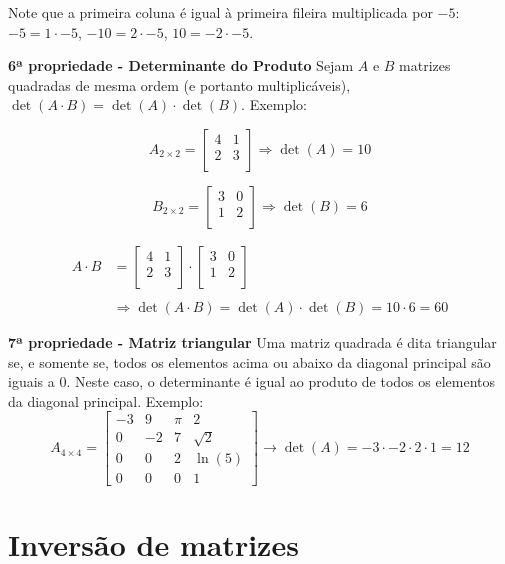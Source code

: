 \documentclass[
  portuguese,
  letterpaper,
  DIV=11,
  numbers=noendperiod]{scrreport}
\begin{document}
Note que a primeira coluna é igual à primeira fileira multiplicada por
\(-5\): \(-5 = 1 \cdot -5\), \(-10 = 2 \cdot -5\), \(10 = -2 \cdot -5\).

\textbf{6ª propriedade - Determinante do Produto} Sejam \(A\) e \(B\)
matrizes quadradas de mesma ordem (e portanto multiplicáveis),
\(\det(A \cdot B) = \det(A) \cdot \det(B)\). Exemplo:

\[
A_{2\times2} =
\begin{bmatrix}
    4 & 1 \\
    2 & 3 \\
\end{bmatrix}
\Rightarrow \det(A) = 10
\]

\[
B_{2\times2} =
\begin{bmatrix}
    3 & 0 \\
    1 & 2 \\
\end{bmatrix} 
\Rightarrow \det(B) = 6
\]

\[
\begin{aligned}
A \cdot B &=
\begin{bmatrix}
    4 & 1 \\
    2 & 3 \\
\end{bmatrix} 
\cdot
\begin{bmatrix}
    3 & 0 \\
    1 & 2 \\
\end{bmatrix} \\ \\
&\Rightarrow \det(A \cdot B) = \det(A) \cdot \det(B) = 10 \cdot 6 = 60
\end{aligned}
\]

\textbf{7ª propriedade - Matriz triangular} Uma matriz quadrada é dita
triangular se, e somente se, todos os elementos acima ou abaixo da
diagonal principal são iguais a \(0\). Neste caso, o determinante é
igual ao produto de todos os elementos da diagonal principal. Exemplo:
\[
A_{4\times4} =
\begin{bmatrix}
    -3 & 9 & \pi & 2  \\
    0 & -2 & 7 & \sqrt{2} \\
    0 & 0  & 2 & \ln(5) \\
    0 & 0 & 0 & 1
\end{bmatrix} 
\rightarrow \det(A) = -3 \cdot -2 \cdot 2 \cdot 1 = 12
\]

\section{Inversão de matrizes}\label{inversuxe3o-de-matrizes}
\end{document}
